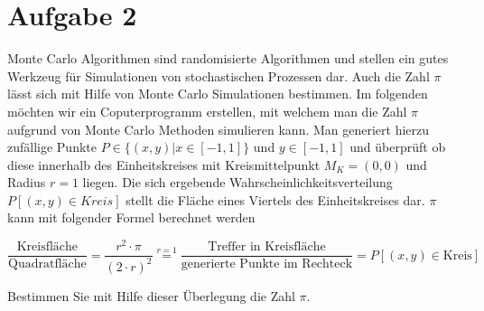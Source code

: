 \section{Aufgabe 2}
Monte Carlo Algorithmen sind randomisierte Algorithmen und stellen ein gutes
Werkzeug für Simulationen von stochastischen Prozessen dar. Auch die Zahl 
$\pi$ lässt sich mit Hilfe von Monte Carlo Simulationen bestimmen. Im
folgenden möchten wir ein Coputerprogramm erstellen, mit welchem man die Zahl
$\pi$ aufgrund von Monte Carlo Methoden simulieren kann. Man generiert
hierzu zufällige Punkte $P \in \{(x,y)|x\in[-1,1]\}$ und $y \in [-1,1]$ und
überprüft ob diese innerhalb des Einheitskreises mit Kreismittelpunkt 
$M_K = (0,0)$ und Radius $r=1$ liegen. Die sich ergebende 
Wahrscheinlichkeitsverteilung $P[(x,y) \in Kreis]$ stellt die Fläche eines
Viertels des Einheitskreises dar. $\pi$ kann mit folgender Formel berechnet
werden

\[ \frac{\text{Kreisfläche}}{\text{Quadratfläche}} =
\frac{r^2\cdot \pi}{(2\cdot r)^2} \stackrel{r=1}{=} 
\frac{\text{Treffer in Kreisfläche}}{\text{generierte Punkte im Rechteck}} =
P[(x,y)\in \text{Kreis}]\]

Bestimmen Sie mit Hilfe dieser Überlegung die Zahl $\pi$.

